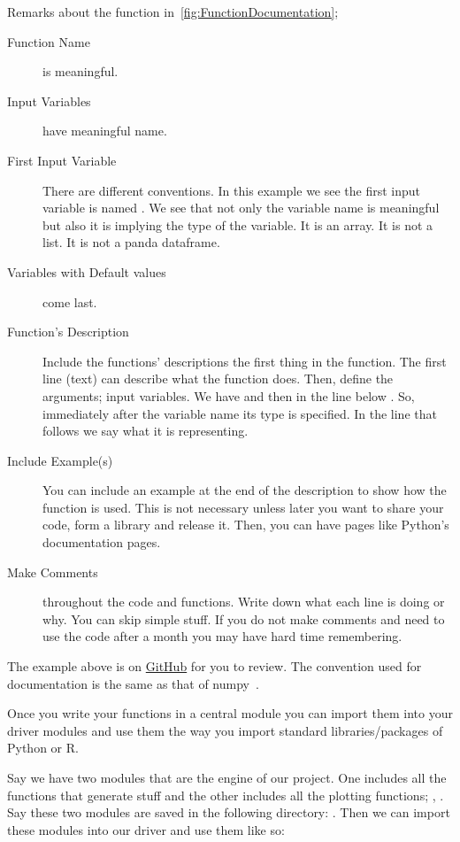 \noindent Remarks about the function in~\cref{fig:FunctionDocumentation};
\begin{description}
\item [Function Name] is meaningful.
\item [Input Variables] have meaningful name. 
\item [First Input Variable] There are different conventions. In this
example we see the first input variable is named .
We see that not only the variable name is meaningful but also
it is implying the type of the variable. It is an array. It is not a list.
It is not a panda dataframe. 

\item [Variables with Default values] come last.

\item [Function's Description] Include the functions' descriptions
the first thing in the function. The first line (text) can describe what the function does. 
Then, define the arguments; input variables. 
We have  and then in the line below .
So, immediately after the variable name its type is specified. In the line that follows we
say what it is representing.

\item [Include Example(s)] You can include an example at the end of the
description to show how the function is used. This is not necessary unless
later you want to share your code, form a library and release it.
Then, you can have pages
like Python's documentation pages.

\item [Make Comments] throughout the code and functions.
Write down what each line is doing or why. You can skip
simple stuff. If you do not make comments and need to use
the code after a month you may have hard time remembering.
\end{description}
The example above is on \href{https://github.com/HNoorazar/Ag/blob/master/Kirtis\_Class/Python/Kirtis\_Class\_core.py}{GitHub} for you to review.
The convention used for documentation is the same as 
that of numpy~\citep{numpyStyle}.

Once you write your functions in a central module
you can import them into your driver modules and use
them the way you import standard libraries/packages of Python or R.

Say we have two modules that are the engine of our project.
One includes all the functions that generate stuff and the other
includes all the plotting functions; ,
.
Say these two modules are saved in 
the following directory:
.
Then we can import these modules into our driver
and use them like so:

